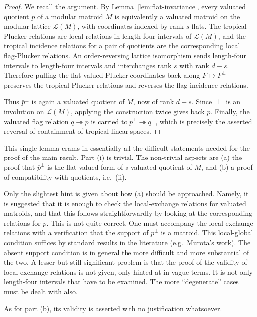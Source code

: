\documentclass[12pt]{article}
\newcommand{\cL}{\mathcal L}
\theoremstyle{plain}
\theoremstyle{definition}
\newcommand{\review}[1]{\begin{reviewbox}#1\end{reviewbox}}
\begin{document}
\begin{proof}
We recall the argument.  By Lemma~\ref{lem:flat-invariance}, every valuated quotient \(p\) of a modular matroid \(M\) is equivalently a valuated matroid on the modular lattice \(\cL(M)\), with coordinates indexed by rank-\(s\) flats.  The tropical Plucker relations are local relations in length-four intervals of \(\cL(M)\), and the tropical incidence relations for a pair of quotients are the corresponding local flag-Plucker relations.  An order-reversing lattice isomorphism sends length-four intervals to length-four intervals and interchanges rank \(s\) with rank \(d-s\).  Therefore pulling the flat-valued Plucker coordinates back along \(F\mapsto F^\perp\) preserves the tropical Plucker relations and reverses the flag incidence relations.

Thus \(\bar p^\perp\) is again a valuated quotient of \(M\), now of rank \(d-s\).  Since \(\perp\) is an involution on \(\cL(M)\), applying the construction twice gives back \(\bar p\).  Finally, the valuated flag relation \(q\twoheadrightarrow p\) is carried to \(p^\perp\twoheadrightarrow q^\perp\), which is precisely the asserted reversal of containment of tropical linear spaces.
\end{proof}
\review{
This single lemma crams in essentially all the difficult statements needed for the proof of the main result. Part (i) is trivial. The non-trivial aspects are (a) the proof that $\overline{p}^{\perp}$ is the flat-valued form of a valuated quotient of $M$, and (b) a proof of compatibility with quotients, i.e.\ (ii).

Only the slightest hint is given about how (a) should be approached. Namely, it is suggested that it is enough to check the local-exchange relations for valuated matroids, and that this follows straightforwardly by looking at the corresponding relations for $p$. This is not quite correct. One must accompany the local-exchange relations with a verification that the support of $p^{\perp}$ is a matroid. This local-global condition suffices by standard results in the literature (e.g.\ Murota's work). The absent support condition is in general the more difficult and more substantial of the two. A lesser but still significant problem is that the proof of the validity of local-exchange relations is not given, only hinted at in vague terms. It is not only length-four intervals that have to be examined. The more ``degenerate'' cases must be dealt with also.

As for part (b), its validity is asserted with no justification whatsoever. 
}
\end{document}
